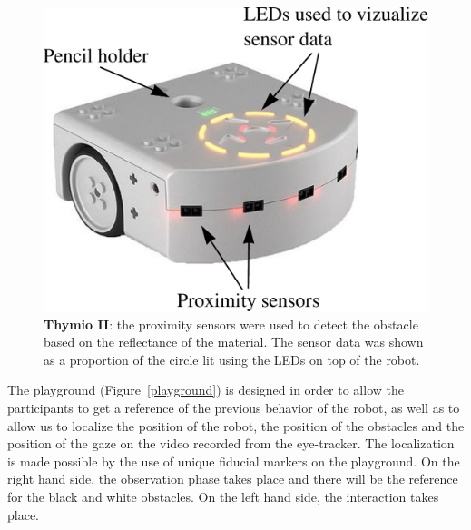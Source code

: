 \documentclass{sig-alternate}
\begin{document}
\begin{figure}
    \centering
    \includegraphics[width=0.9\linewidth]{thymio}
    \caption{\small \textbf{Thymio II}: the proximity sensors were used to
    detect the obstacle based on the reflectance of the material. The sensor
    data was shown as a proportion of the circle lit using the LEDs on top of the
    robot.}

    \label{thymio}
\end{figure}

The playground (Figure~\ref{playground}) is designed in order to allow the
participants to get a reference of the previous behavior of the robot, as well
as to allow us to localize the position of the robot, the position of the
obstacles and the position of the gaze on the video recorded from the
eye-tracker. The localization is made possible by the use of unique fiducial
markers on the playground. On the right hand side, the observation phase takes
place and there will be the reference for the black and white obstacles. On the
left hand side, the interaction takes place.
\end{document}
